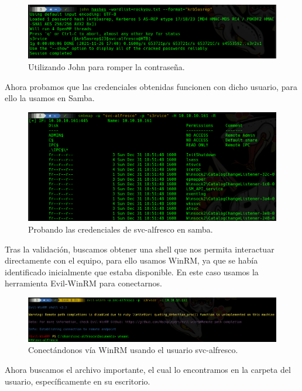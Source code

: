 \documentclass{article}
\begin{document}
\begin{figure}[H]
	\center
	\includegraphics[width=\textwidth]{images/forest/crackeado.png}
	\caption{Utilizando John para romper la contraseña.}
\end{figure}

Ahora probamos que las credenciales obtenidas funcionen con dicho usuario, para ello la usamos en Samba. 

\begin{figure}[H]
	\center
	\includegraphics[width=\textwidth]{images/forest/probando_creds.png}
	\caption{Probando las credenciales de svc-alfresco en samba.}
\end{figure}

Tras la validación, buscamos obtener una shell que nos permita interactuar directamente con el equipo, para ello usamos WinRM, ya que se había identificado inicialmente que estaba disponible. En este caso usamos la herramienta Evil-WinRM para conectarnos.

\begin{figure}[H]
	\center
	\includegraphics[width=\textwidth]{images/forest/conexionConWinRM.png}
	\caption{Conectándonos vía WinRM usando el usuario svc-alfresco.}
\end{figure}

Ahora buscamos el archivo importante, el cual lo encontramos en la carpeta del usuario, específicamente en su escritorio.
\end{document}
